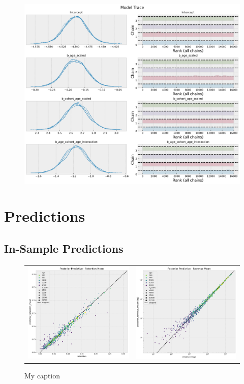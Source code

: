 \documentclass[11pt]{amsart}
\begin{document}
\begin{figure}
    \includegraphics[width=\textwidth]{images/revenue_retention_41_0.png}
\end{figure}

\section{Predictions}

\subsection{In-Sample Predictions}

\begin{figure}
    \begin{tabular}{cc}
        \includegraphics[width=0.5 \textwidth]{images/revenue_retention_45_0.png} & 
        \includegraphics[width=0.5 \textwidth]{images/revenue_retention_47_0.png}
    \end{tabular}
    \caption{My caption}
\end{figure}
\end{document}
